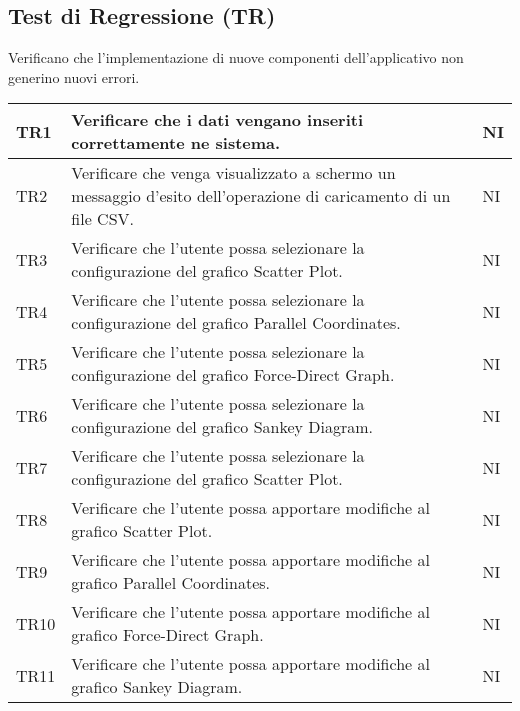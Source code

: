     \subsection{Test di Regressione (TR)} Verificano che l'implementazione di nuove componenti dell'applicativo non generino nuovi errori.
    \begin{center}
        \renewcommand\arraystretch{1.5}
        \centering
        \begin{longtable}{|p{1.5cm}|p{11cm}|p{1cm}|}
        \hline
    \rowcolor[HTML]{EFEFEF}
            TR1 & Verificare che i dati vengano inseriti correttamente ne sistema. & NI\\ \hline
            \rowcolor[HTML]{C0C0C0}
            TR2 & Verificare che venga visualizzato a schermo un messaggio d’esito dell’operazione di caricamento di un file CSV.& NI\\ \hline
            \rowcolor[HTML]{EFEFEF}
            TR3 & Verificare che l’utente possa selezionare la configurazione del grafico Scatter Plot. & NI\\ \hline
            \rowcolor[HTML]{C0C0C0}
            TR4 & Verificare che l’utente possa selezionare la configurazione del grafico Parallel Coordinates. & NI\\ \hline
            \rowcolor[HTML]{EFEFEF}
            TR5 & Verificare che l’utente possa selezionare la configurazione del grafico Force-Direct Graph. & NI\\ \hline
            \rowcolor[HTML]{C0C0C0}
            TR6 & Verificare che l’utente possa selezionare la configurazione del grafico Sankey Diagram. & NI\\ \hline
            \rowcolor[HTML]{EFEFEF}
            TR7 & Verificare che l’utente possa selezionare la configurazione del grafico Scatter Plot. & NI\\ \hline
            \rowcolor[HTML]{C0C0C0}
            TR8 & Verificare che l’utente possa apportare modifiche al grafico Scatter Plot. & NI\\ \hline
            \rowcolor[HTML]{EFEFEF}
            TR9 & Verificare che l’utente possa apportare modifiche al grafico Parallel Coordinates. & NI\\ \hline
            \rowcolor[HTML]{C0C0C0}
            TR10 & Verificare che l’utente possa apportare modifiche al grafico Force-Direct Graph. & NI\\ \hline
            \rowcolor[HTML]{EFEFEF}
            TR11 & Verificare che l’utente possa apportare modifiche al grafico Sankey Diagram. & NI\\ \hline

\end{longtable}
\end{center}
